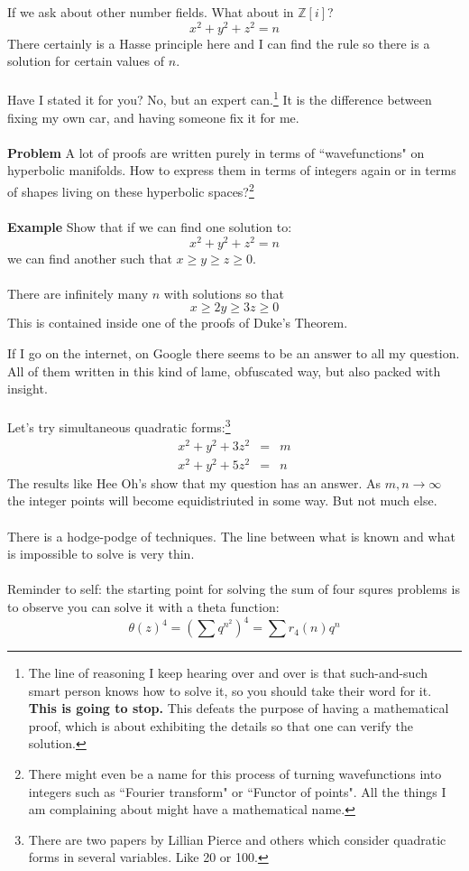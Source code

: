 \documentclass[12pt]{article}
\begin{document}
\newpage

\noindent If we ask about other number fields. What about in $\mathbb{Z}[i]$? 
$$ x^2 + y^2 + z^2 = n  $$
There certainly is a Hasse principle here and I can find the rule so there is a solution for certain values of $n$.  \\ \\ Have I stated it for you? No, but an expert can.\footnote{
The line of reasoning I keep hearing over and over is that such-and-such smart person knows how to solve it, so you should take their word for it.  \textbf{This is going to stop.}  This defeats the purpose of having a mathematical proof, which is about exhibiting the details so that one can verify the solution.}  It is the difference between fixing my own car, and having someone fix it for me. \\ \\
\textbf{Problem} A lot of proofs are written purely in terms of ``wavefunctions" on hyperbolic manifolds.  How to express them in terms of integers again or in terms of shapes living on these hyperbolic spaces?\footnote{There might even be a name for this process of turning wavefunctions into integers such as ``Fourier transform" or ``Functor of points".  All the things I am complaining about might have a mathematical name.} \\ \\
\textbf{Example}  Show that if we can find one solution to:
$$ x^2 + y^2 + z^2 = n$$
we can find another such that $x \geq y \geq z \geq 0$. \\ \\
There are infinitely many $n$ with solutions so that $$x \geq 2y \geq 3z \geq 0$$  This is contained inside one of the proofs of Duke's Theorem.

\newpage

\noindent If I go on the internet, on Google there seems to be an answer to all my question.  All of them written in this kind of lame, obfuscated way, but also packed with insight. \\ \\
Let's try simultaneous quadratic forms:\footnote{There are two papers by Lillian Pierce and others which consider quadratic forms in several variables. Like 20 or 100.}
\begin{eqnarray*}
 x^2 + y^2 + 3z^2 &=& m \\
 x^2 + y^2 + 5z^2 &=& n 
\end{eqnarray*}
The results like Hee Oh's show that my question has an answer.  As $m,n \to \infty$ the integer points will become equidistriuted in some way.  But not much else.  \\ \\
There is a hodge-podge of techniques.  The line between what is known and what is impossible to solve is very thin. \\ \\
Reminder to self: the starting point for solving the sum of four squres problems is to observe you can solve it with a theta function:
$$ \theta(z)^4 = \left(\sum q^{n^2} \right)^4 = 
\sum r_4(n) q^n $$
\end{document}
